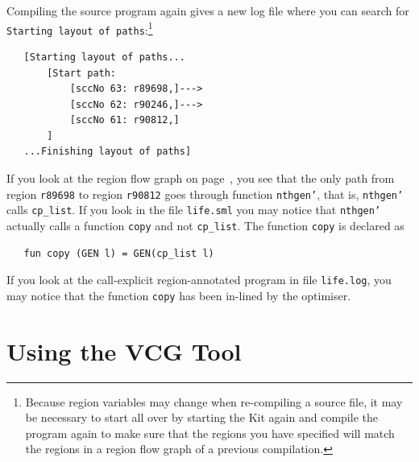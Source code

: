 \documentclass[12pt]{book}
\begin{document}
Compiling the source program again gives a new log file where you can
search for \texttt{Starting layout of paths}:\footnote{Because region
  variables may change when re-compiling a source file, it may be
  necessary to start all over by starting the Kit again and compile
  the program again to make sure that the regions you have specified
  will match the regions in a region flow graph of a previous
  compilation.}
\begin{verbatim}
   [Starting layout of paths...
       [Start path: 
           [sccNo 63: r89698,]--->
           [sccNo 62: r90246,]--->
           [sccNo 61: r90812,]
       ]
   ...Finishing layout of paths]
\end{verbatim}
If you look at the region flow graph on
page~\pageref{reg_flow_graph.ex}, you see that the only path from
region \texttt{r89698} to region \texttt{r90812} goes through function
\texttt{nthgen'}, that is, \texttt{nthgen'} calls \texttt{cp\_list}. If
you look in the file \texttt{life.sml} you may notice that
\texttt{nthgen'} actually calls a function \texttt{copy} and not
\texttt{cp\_list}. The function \texttt{copy} is declared as
\begin{verbatim}
   fun copy (GEN l) = GEN(cp_list l)
\end{verbatim}
If you look at the call-explicit region-annotated program in file
\texttt{life.log}, you may notice that the function \texttt{copy} has
been in-lined by the optimiser.

\section{Using the VCG Tool}
\end{document}
